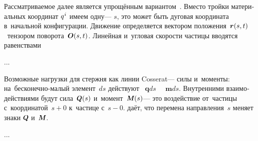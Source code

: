 

\begin{otherlanguage}{russian}

Рассматриваемое далее является упрощённым вариантом~.
Вместо тройки материальных координат ${q^{\hspace{.1ex}i}}$ имеем одну\:--- $s$, это может быть дуговая координата в~начальной конфигурации.
Движение определяется вектором положения~${\bm{r}(s,t)}$ ~тензором поворота~${\bm{O}(s,t)}$.
Линейная и~угловая скорости частицы вводятся равенствами

...



\end{otherlanguage}



\begin{otherlanguage}{russian}

Возможные нагрузки для стержня как линии Cosserat\:--- \hbox{силы} и~моменты: на~бесконечно-малый элемент~$ds$ действуют ~${\bm{q}ds}$ ~~${\bm{m}ds}$.
Внутренними взаимо\-действиями будут сила~${\mathboldQ \hspace{.1ex} (s)}$ и~момент~${\mathboldM \hspace{.1ex} (s)}$\:--- это воздействие от~частицы с~координатой~${s\!+\!0}$ к~частице с~${s\!-\!0}$.
 даёт, что перемена направления~$s$ меняет знаки ${\mathboldQ}$ и~${\mathboldM}$.

...



\end{otherlanguage}

